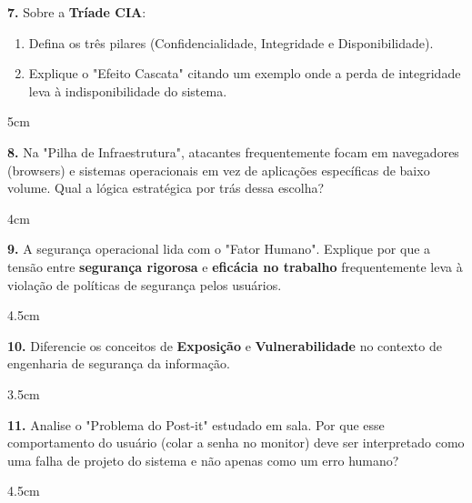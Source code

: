 \documentclass[12pt]{article}
\begin{document}
\vspace{0.5cm}

\noindent \textbf{7.} Sobre a \textbf{Tríade CIA}:
\begin{enumerate}[label=\alph*)]
    \item Defina os três pilares (Confidencialidade, Integridade e Disponibilidade).
    \item Explique o "Efeito Cascata" citando um exemplo onde a perda de integridade leva à indisponibilidade do sistema.
\end{enumerate}
\begin{resposta}{5cm}
\end{resposta}

\vspace{0.5cm}

\noindent \textbf{8.} Na "Pilha de Infraestrutura", atacantes frequentemente focam em navegadores (browsers) e sistemas operacionais em vez de aplicações específicas de baixo volume. Qual a lógica estratégica por trás dessa escolha?
\begin{resposta}{4cm}
\end{resposta}

\vspace{0.5cm}

\noindent \textbf{9.} A segurança operacional lida com o "Fator Humano". Explique por que a tensão entre \textbf{segurança rigorosa} e \textbf{eficácia no trabalho} frequentemente leva à violação de políticas de segurança pelos usuários.
\begin{resposta}{4.5cm}
\end{resposta}

\vspace{0.5cm}

\noindent \textbf{10.} Diferencie os conceitos de \textbf{Exposição} e \textbf{Vulnerabilidade} no contexto de engenharia de segurança da informação.
\begin{resposta}{3.5cm}
\end{resposta}

\vspace{0.5cm}

\noindent \textbf{11.} Analise o "Problema do Post-it" estudado em sala. Por que esse comportamento do usuário (colar a senha no monitor) deve ser interpretado como uma falha de projeto do sistema e não apenas como um erro humano?
\begin{resposta}{4.5cm}
\end{resposta}
\end{document}
